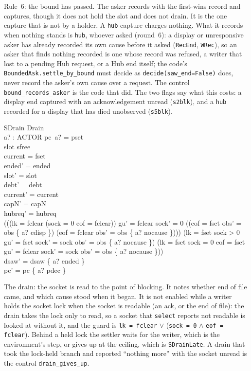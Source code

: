 \documentclass[a4paper,10pt,fleqn]{article}
\begin{document}
Rule~6: the bound has passed.  The asker records with the first-wins record and
captures, though it does not hold the slot and does not drain.  It is the one
capture that is not by a holder.  A \texttt{hub} capture charges nothing.  What
it records when nothing stands is \texttt{hub}, whoever asked (round~6): a
display or unresponsive asker has already recorded its own cause before it asked
(\texttt{RecEnd}, \texttt{WRec}), so an asker that finds nothing recorded is one
whose record was refused, a writer that lost to a pending Hub request, or a Hub
end itself; the code's \texttt{BoundedAsk.settle\_by\_bound} must decide as
\texttt{decide(saw\_end=False)} does, never record the asker's own cause over a
request.  The control \texttt{bound\_records\_asker} is the code that did.
The two flags say what this costs: a display end captured with an
acknowledgement unread (\texttt{s2blk}), and a \texttt{hub} recorded for a
display that has died unobserved (\texttt{s5blk}).

\begin{schema}{SDrain}
  Drain \\
  a? : ACTOR
\where
  pc~a? = pset \\
  slot \neq sfree \\
  current = fset \\
  ended' = ended \\
  slot' = slot \\
  debt' = debt \\
  current' = current \\
  capN' = capN \\
  hubreq' = hubreq \\
  (((lk = fclear \lor (sock = 0 \land eof = fclear)) \land gu' = fclear \land
      sock' = 0 \land
      ((eof = fset \land obs' = obs \oplus \{ a? \mapsto cdisp \}) \lor
        (eof = fclear \land obs' = obs \oplus \{ a? \mapsto nocause \}))) \lor
    (lk = fset \land sock > 0 \land gu' = fset \land sock' = sock \land
      obs' = obs \oplus \{ a? \mapsto nocause \}) \lor
    (lk = fset \land sock = 0 \land eof = fset \land gu' = fclear \land
      sock' = sock \land obs' = obs \oplus \{ a? \mapsto nocause \})) \\
  dsaw' = dsaw \oplus \{ a? \mapsto ended \} \\
  pc' = pc \oplus \{ a? \mapsto pdec \}
\end{schema}

The drain: the socket is read to the point of blocking.  It notes whether end of
file came, and which cause stood when it began.  It is not enabled while a writer
holds the socket lock when the socket is readable (an ack, or the end of file):
the drain takes the lock only to read, so a socket that \texttt{select} reports
not readable is looked at without it, and the guard is
\texttt{lk = fclear} $\lor$ (\texttt{sock = 0} $\land$ \texttt{eof = fclear}).
Behind a held lock the settler waits for the writer, which is the environment's
step, or gives up at the ceiling, which is \texttt{SDrainLate}.  A drain that
took the lock-held branch and reported ``nothing more'' with the socket unread
is the control \texttt{drain\_gives\_up}.
\end{document}
